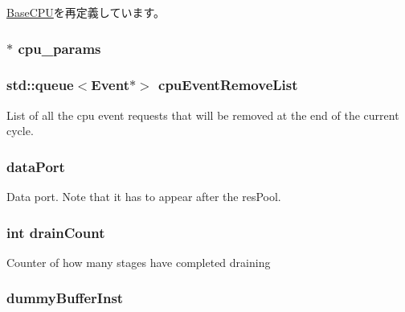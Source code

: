 \hyperlink{classBaseCPU_a367f5d07843a54b9454fa6f733fd6d50}{BaseCPU}を再定義しています。\hypertarget{classInOrderCPU_abd8a4a05c67ac6b36a477d4243ce9681}{
\subsubsection[{cpu\_\-params}]{$\ast$ {\bf cpu\_\-params}}}
\label{classInOrderCPU_abd8a4a05c67ac6b36a477d4243ce9681}
\hypertarget{classInOrderCPU_a27f6e838bf5d421831ac5e451e61ccce}{
\subsubsection[{cpuEventRemoveList}]{\setlength{\rightskip}{0pt plus 5cm}std::queue$<${\bf Event}$\ast$$>$ {\bf cpuEventRemoveList}}}
\label{classInOrderCPU_a27f6e838bf5d421831ac5e451e61ccce}
List of all the cpu event requests that will be removed at the end of the current cycle. \hypertarget{classInOrderCPU_a8e4a84e6f2b11310fbb12e5b7598947f}{
\subsubsection[{dataPort}]{ {\bf dataPort}}}
\label{classInOrderCPU_a8e4a84e6f2b11310fbb12e5b7598947f}
Data port. Note that it has to appear after the resPool. \hypertarget{classInOrderCPU_a91cd9b9d8a8f3793796b9eff33e0ffeb}{
\subsubsection[{drainCount}]{\setlength{\rightskip}{0pt plus 5cm}int {\bf drainCount}}}
\label{classInOrderCPU_a91cd9b9d8a8f3793796b9eff33e0ffeb}
Counter of how many stages have completed draining \hypertarget{classInOrderCPU_a09dc4a08ace7d6e74531ffff1ba5d905}{
\subsubsection[{dummyBufferInst}]{ {\bf dummyBufferInst}}}
